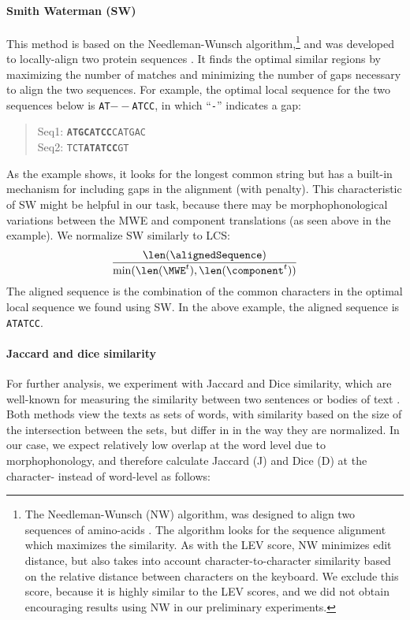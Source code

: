 \documentclass[output=paper
,modfonts
,nonflat]{langsci/langscibook}
\begin{document}
\paragraph*{Smith Waterman (SW)}
This method is based on the Needleman-Wunsch algorithm,\footnote{The
 Needleman-Wunsch (NW) algorithm, was designed to align two sequences
 of amino-acids \citep{needleman1970}. The algorithm looks for the
 sequence alignment which maximizes the similarity. As with the LEV
 score, NW minimizes edit distance, but also takes into account
 character-to-character similarity based on the relative distance
 between characters on the keyboard. We exclude this score, because
 it is highly similar to the LEV scores, and we did not obtain
 encouraging results using NW in our preliminary experiments.} and
was developed to locally-align two protein sequences
\citep{smith1981}. It finds the optimal similar regions by maximizing
the number of matches and minimizing the number of gaps necessary to
align the two sequences. For example, the optimal local sequence for
the two sequences below is \texttt{AT$--$ATCC}, in which
``\texttt{-}'' indicates a gap:
\begin{quote}
Seq1: \texttt{\textbf{ATGCATCC}CATGAC}\\
Seq2: \texttt{TCT\textbf{ATATCC}GT}
\end{quote}
As the example shows, it looks for the longest common string but has a
built-in mechanism for including gaps in the alignment (with
penalty). This characteristic of SW might be helpful in our task,
because there may be morphophonological variations between the MWE and
component translations (as seen above in the 
example). We normalize SW similarly to LCS:
\begin{eqnarray*}
\frac{\len(\alignedSequence)}{\min(\len(\MWE^t),\len(\component^t))}
\end{eqnarray*}
The aligned sequence is the combination of the common characters in the
optimal local sequence we found using SW. In the above example, the
aligned sequence is \texttt{ATATCC}.



\paragraph*{Jaccard and dice similarity}
For further analysis, we experiment with Jaccard and Dice similarity,
which are well-known for measuring the similarity between two
sentences or bodies of text \citep{gomaa2013survey}.
Both methods view the texts as sets of words, with similarity based on
the size of the intersection between the sets, but differ in in the
way they are normalized. In our case, we expect relatively low overlap
at the word level due to morphophonology, and therefore calculate
Jaccard (J) and Dice (D) at the character- instead of word-level as
follows:
\end{document}

